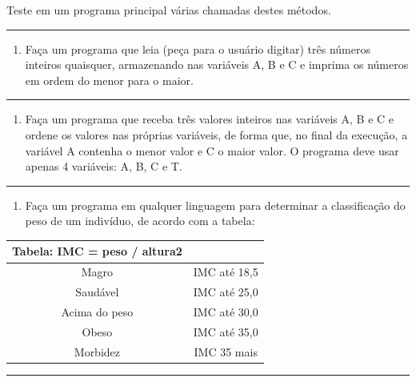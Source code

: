 \documentclass[12pt,a4paper]{article}
\providecommand{\tightlist}{%
      \setlength{\itemsep}{0pt}\setlength{\parskip}{0pt}}
\begin{document}
Teste em um programa principal várias chamadas destes métodos.

    \begin{center}\rule{0.5\linewidth}{0.5pt}\end{center}

\begin{enumerate}
\def\labelenumi{\arabic{enumi}.}
\setcounter{enumi}{1}
\tightlist
\item
  Faça um programa que leia (peça para o usuário digitar) três números
  inteiros quaisquer, armazenando nas variáveis A, B e C e imprima os
  números em ordem do menor para o maior.
\end{enumerate}

    \begin{center}\rule{0.5\linewidth}{0.5pt}\end{center}

\begin{enumerate}
\def\labelenumi{\arabic{enumi}.}
\setcounter{enumi}{2}
\tightlist
\item
  Faça um programa que receba três valores inteiros nas variáveis A, B e
  C e ordene os valores nas próprias variáveis, de forma que, no final
  da execução, a variável A contenha o menor valor e C o maior valor. O
  programa deve usar apenas 4 variáveis: A, B, C e T.
\end{enumerate}

    \begin{center}\rule{0.5\linewidth}{0.5pt}\end{center}

\begin{enumerate}
\def\labelenumi{\arabic{enumi}.}
\setcounter{enumi}{3}
\tightlist
\item
  Faça um programa em qualquer linguagem para determinar a classificação
  do peso de um indivíduo, de acordo com a tabela:
\end{enumerate}

    \begin{longtable}[]{@{}cc@{}}
\toprule
Tabela: IMC = peso / altura2 &\tabularnewline
\midrule
\endhead
Magro & IMC até 18,5\tabularnewline
Saudável & IMC até 25,0\tabularnewline
Acima do peso & IMC até 30,0\tabularnewline
Obeso & IMC até 35,0\tabularnewline
Morbidez & IMC 35 mais\tabularnewline
\bottomrule
\end{longtable}

    \begin{center}\rule{0.5\linewidth}{0.5pt}\end{center}
\end{document}
